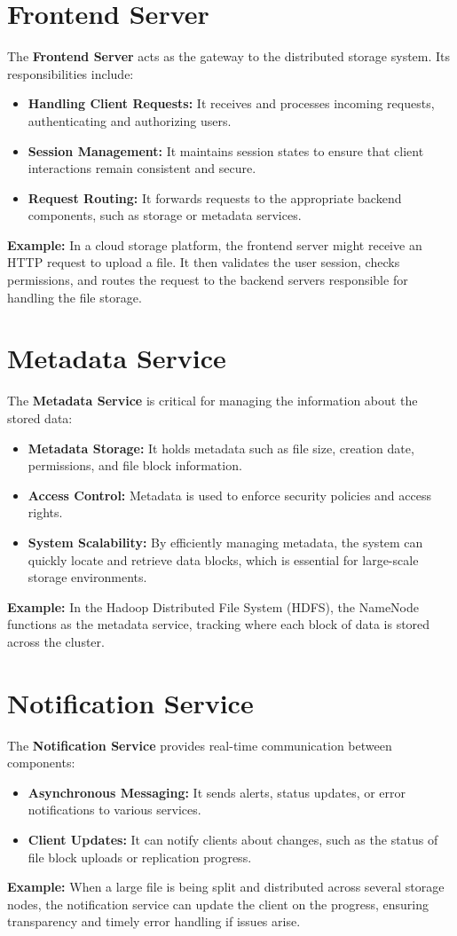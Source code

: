 \section{Frontend Server}
The \textbf{Frontend Server} acts as the gateway to the distributed storage system. Its responsibilities include:
\begin{itemize}
    \item \textbf{Handling Client Requests:} It receives and processes incoming requests, authenticating and authorizing users.
    \item \textbf{Session Management:} It maintains session states to ensure that client interactions remain consistent and secure.
    \item \textbf{Request Routing:} It forwards requests to the appropriate backend components, such as storage or metadata services.
\end{itemize}
\textbf{Example:} In a cloud storage platform, the frontend server might receive an HTTP request to upload a file. It then validates the user session, checks permissions, and routes the request to the backend servers responsible for handling the file storage.

\section{Metadata Service}
The \textbf{Metadata Service} is critical for managing the information about the stored data:
\begin{itemize}
    \item \textbf{Metadata Storage:} It holds metadata such as file size, creation date, permissions, and file block information.
    \item \textbf{Access Control:} Metadata is used to enforce security policies and access rights.
    \item \textbf{System Scalability:} By efficiently managing metadata, the system can quickly locate and retrieve data blocks, which is essential for large-scale storage environments.
\end{itemize}
\textbf{Example:} In the Hadoop Distributed File System (HDFS), the NameNode functions as the metadata service, tracking where each block of data is stored across the cluster.

\section{Notification Service}
The \textbf{Notification Service} provides real-time communication between components:
\begin{itemize}
    \item \textbf{Asynchronous Messaging:} It sends alerts, status updates, or error notifications to various services.
    \item \textbf{Client Updates:} It can notify clients about changes, such as the status of file block uploads or replication progress.
\end{itemize}
\textbf{Example:} When a large file is being split and distributed across several storage nodes, the notification service can update the client on the progress, ensuring transparency and timely error handling if issues arise.

